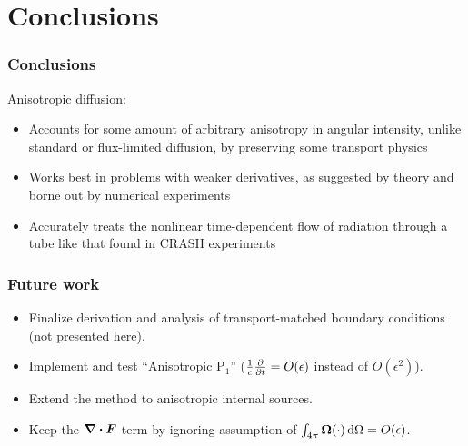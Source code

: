 \documentclass{beamer}
\begin{document}
\section{Conclusions}
\begin{frame}
  \frametitle{Conclusions}
  Anisotropic diffusion:
  \begin{itemize}
    \item Accounts for some amount of arbitrary anisotropy in
      angular intensity, unlike standard or flux-limited diffusion, by
      preserving some transport physics
    \item Works best in problems with weaker derivatives, as suggested by
      theory and borne out by numerical experiments
    \item Accurately treats the nonlinear time-dependent flow of radiation
      through a tube like that found in CRASH experiments
  \end{itemize}
\end{frame}
\begin{frame}
  \frametitle{Future work}
  \begin{itemize}
    \item Finalize derivation and analysis of transport-matched boundary
      conditions (not presented here).
    \item Implement and test ``Anisotropic P$_1$''
      ($\frac1c\frac{\partial }{\partial t}=O(\epsilon)$ instead of $O(\epsilon^2)$).
    \item Extend the method to anisotropic internal sources.
    \item Keep the $\bm{\nabla} \bm{\cdot} \bm{F}$ term by ignoring assumption of
      $\int_{4\pi} \bm{\Omega} (\cdot) \mathop{}\!\mathrm{d}\Omega = O(\epsilon)$.
  \end{itemize}
\end{frame}
\appendix
\end{document}
